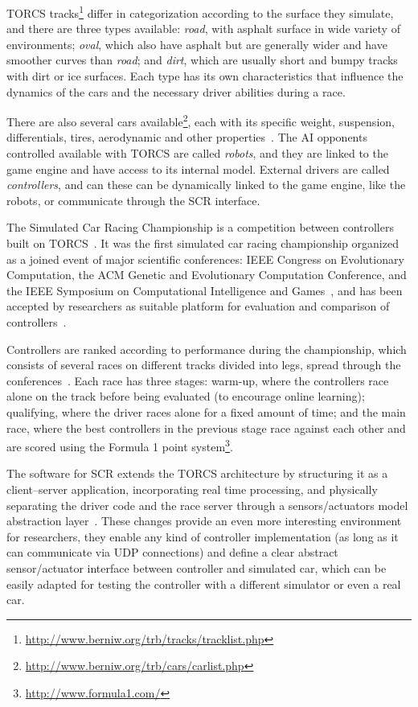\newcommand{\track}[1]{\emph{#1}}%
TORCS tracks\footnote{\url{http://www.berniw.org/trb/tracks/tracklist.php}} differ in categorization according to the surface they simulate, and there are three types available: \track{road}, with asphalt surface in wide variety of environments; \track{oval}, which also have asphalt but are generally wider and have smoother curves than \track{road}; and \track{dirt}, which are usually short and bumpy tracks with dirt or ice surfaces. Each type has its own characteristics that influence the dynamics of the cars and the necessary driver abilities during a race.

There are also several cars available\footnote{\url{http://www.berniw.org/trb/cars/carlist.php}}, each with its specific weight, suspension, differentials, tires, aerodynamic and other properties~\cite{TORCS}. The AI opponents controlled available with TORCS are called \emph{robots}, and they are linked to the game engine and have access to its internal model. External drivers are called \emph{controllers}, and can these can be dynamically linked to the game engine, like the robots, or communicate through the SCR interface.

The Simulated Car Racing Championship is a competition between controllers built on TORCS~\cite{SCR}. It was the first simulated car racing championship organized as a joined event of major scientific conferences: IEEE Congress on Evolutionary Computation, the ACM Genetic and Evolutionary Computation Conference, and the IEEE Symposium on Computational Intelligence and Games~\cite{2009}, and has been accepted by researchers as suitable platform for evaluation and comparison of controllers~\cite{TORCS}.

Controllers are ranked according to performance during the championship, which consists of several races on different tracks divided into legs, spread through the conferences~\cite{2009}. Each race has three stages: warm-up, where the controllers race alone on the track before being evaluated (to encourage online learning); qualifying, where the driver races alone for a fixed amount of time; and the main race, where the best controllers in the previous stage race against each other and are scored using the Formula 1 point system\footnote{\url{http://www.formula1.com/}}.

The software for SCR extends the TORCS architecture by structuring it as a client–server application, incorporating real time processing, and physically separating the driver code and the race server through a sensors/actuators model abstraction layer~\cite{2009}. These changes provide an even more interesting environment for researchers, they enable any kind of controller implementation (as long as it can communicate via UDP connections) and define a clear abstract sensor/actuator interface between controller and simulated car, which can be easily adapted for testing the controller with a different simulator or even a real car.

